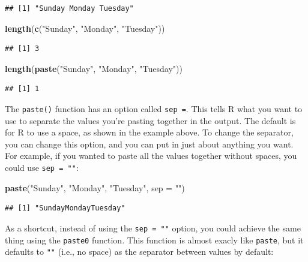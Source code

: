 \documentclass[]{book}
\makeatletter
\newenvironment{Shaded}{\begin{snugshade}}{\end{snugshade}}
\newcommand{\KeywordTok}[1]{\textcolor[rgb]{0.13,0.29,0.53}{\textbf{{#1}}}}
\newcommand{\DataTypeTok}[1]{\textcolor[rgb]{0.13,0.29,0.53}{{#1}}}
\newcommand{\StringTok}[1]{\textcolor[rgb]{0.31,0.60,0.02}{{#1}}}
\newcommand{\NormalTok}[1]{{#1}}
\newenvironment{kframe}{%
\medskip{}
\setlength{\fboxsep}{.8em}
 \def\at@end@of@kframe{}%
 \ifinner\ifhmode%
  \def\at@end@of@kframe{\end{minipage}}%
  \begin{minipage}{\columnwidth}%
 \fi\fi%
 \def\FrameCommand##1{\hskip\@totalleftmargin \hskip-\fboxsep
 \colorbox{shadecolor}{##1}\hskip-\fboxsep
     \hskip-\linewidth \hskip-\@totalleftmargin \hskip\columnwidth}%
 \MakeFramed {\advance\hsize-\width
   \@totalleftmargin\z@ \linewidth\hsize
   \@setminipage}}%
 {\par\unskip\endMakeFramed%
 \at@end@of@kframe}
\renewenvironment{Shaded}{\begin{kframe}}{\end{kframe}}
\makeatother
\begin{document}
\begin{verbatim}
## [1] "Sunday Monday Tuesday"
\end{verbatim}

\begin{Shaded}
\begin{Highlighting}[]
\KeywordTok{length}\NormalTok{(}\KeywordTok{c}\NormalTok{(}\StringTok{"Sunday"}\NormalTok{, }\StringTok{"Monday"}\NormalTok{, }\StringTok{"Tuesday"}\NormalTok{))}
\end{Highlighting}
\end{Shaded}

\begin{verbatim}
## [1] 3
\end{verbatim}

\begin{Shaded}
\begin{Highlighting}[]
\KeywordTok{length}\NormalTok{(}\KeywordTok{paste}\NormalTok{(}\StringTok{"Sunday"}\NormalTok{, }\StringTok{"Monday"}\NormalTok{, }\StringTok{"Tuesday"}\NormalTok{))}
\end{Highlighting}
\end{Shaded}

\begin{verbatim}
## [1] 1
\end{verbatim}

The \texttt{paste()} function has an option called \texttt{sep\ =}. This
tells R what you want to use to separate the values you're pasting
together in the output. The default is for R to use a space, as shown in
the example above. To change the separator, you can change this option,
and you can put in just about anything you want. For example, if you
wanted to paste all the values together without spaces, you could use
\texttt{sep\ =\ ""}:

\begin{Shaded}
\begin{Highlighting}[]
\KeywordTok{paste}\NormalTok{(}\StringTok{"Sunday"}\NormalTok{, }\StringTok{"Monday"}\NormalTok{, }\StringTok{"Tuesday"}\NormalTok{, }\DataTypeTok{sep =} \StringTok{""}\NormalTok{)}
\end{Highlighting}
\end{Shaded}

\begin{verbatim}
## [1] "SundayMondayTuesday"
\end{verbatim}

As a shortcut, instead of using the \texttt{sep\ =\ ""} option, you
could achieve the same thing using the \texttt{paste0} function. This
function is almost exacly like \texttt{paste}, but it defaults to
\texttt{""} (i.e., no space) as the separator between values by default:
\end{document}
